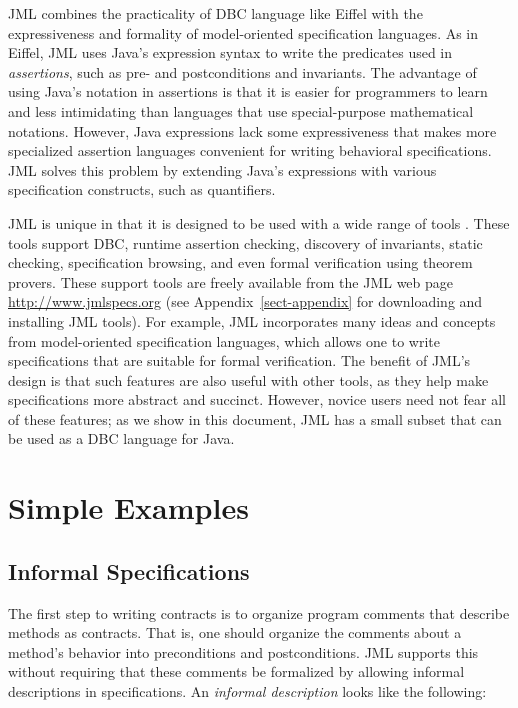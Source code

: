 \documentclass[twocolumn]{article}
\begin{document}
JML combines the practicality of DBC language like Eiffel
\cite{Meyer92b} with the expressiveness and formality of
model-oriented specification languages.  As in Eiffel, JML uses Java's
expression syntax to write the predicates used in \emph{assertions},
such as pre- and postconditions and invariants.
The advantage of using Java's notation in assertions
is that it is easier for programmers to learn and less
intimidating than languages that use special-purpose mathematical
notations. However, Java expressions lack some expressiveness
that makes more specialized assertion languages convenient for writing
behavioral specifications.
JML solves this problem by extending Java's expressions with various
specification constructs, such as quantifiers.

JML is unique in that it is designed to be used with a wide range of
tools \cite{Burdy-etal05,Leavens-etal05}.
These tools support DBC, runtime assertion checking, discovery of
invariants, static checking, specification browsing, and even
formal verification using theorem provers.
These support tools are freely available from the JML web page
\url{http://www.jmlspecs.org} 
(see Appendix~\ref{sect-appendix} for downloading and installing JML
tools).
For example, JML incorporates many ideas and concepts from
model-oriented specification languages,
which allows one to write specifications that are suitable for formal
verification.  The benefit of JML's design is that such features are
also useful with other tools, as they help make specifications more
abstract and succinct.
However, novice users need not fear all of these features;
as we show in this document, JML has a small subset that can be used
as a DBC language for Java.  

\section{Simple Examples}
\subsection{Informal Specifications}

The first step to writing contracts is to organize program comments
that describe methods as contracts.
That is, one should organize the comments about a method's behavior
into preconditions and postconditions.
JML supports this without requiring that these comments be formalized
by allowing informal descriptions in specifications.
An \emph{informal description} looks like the following:
\end{document}
